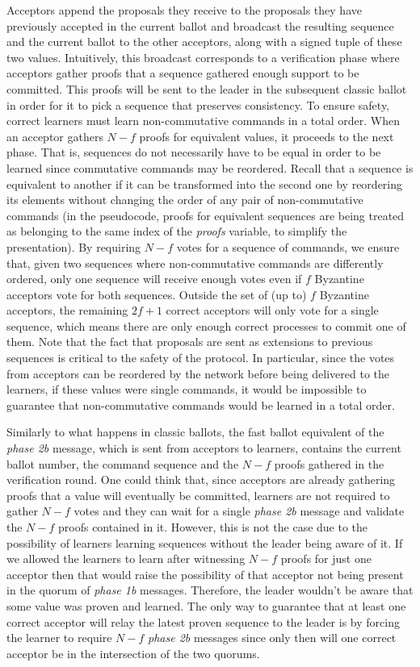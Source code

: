 Acceptors append the proposals they receive to the proposals they have previously accepted in the current ballot and broadcast the resulting sequence and the current ballot to the other acceptors, along with a signed tuple of these two values. Intuitively, this broadcast corresponds to a verification phase where acceptors gather proofs that a sequence gathered enough support to be committed. This proofs will be sent to the leader in the subsequent classic ballot in order for it to pick a sequence that preserves consistency. To ensure safety, correct learners must learn non-commutative commands in a total order. When an acceptor gathers $N-f$ proofs for equivalent values, it proceeds to the next phase. That is, sequences do not necessarily have to be equal in order to be learned since commutative commands may be reordered. Recall that a sequence is equivalent to another if it can be transformed into the second one by reordering its elements without changing the order of any pair of non-commutative commands (in the pseudocode, proofs for equivalent sequences are being treated as belonging to the same index of the \emph{proofs} variable, to simplify the presentation). By requiring $N-f$ votes for a sequence of commands, we ensure that, given two sequences where non-commutative commands are differently ordered, only one sequence will receive enough votes even if $f$ Byzantine acceptors vote for both sequences. Outside the set of (up to) $f$ Byzantine acceptors, the remaining $2f+1$ correct acceptors will only vote for a single sequence, which means there are only enough correct processes to commit one of them. Note that the fact that proposals are sent as extensions to previous sequences is critical to the safety of the protocol. In particular, since the votes from acceptors can be reordered by the network before being delivered to the learners, if these values were single commands, it would be impossible to guarantee that non-commutative commands would be learned in a total order. \par
{} Similarly to what happens in classic ballots, the fast ballot equivalent of the \textit{phase 2b} message, which is sent from acceptors to learners, contains the current ballot number, the command sequence and the $N-f$ proofs gathered in the verification round. One could think that, since acceptors are already gathering proofs that a value will eventually be committed, learners are not required to gather $N-f$ votes and they can wait for a single \textit{phase 2b} message and validate the $N-f$ proofs contained in it. However, this is not the case due to the possibility of learners learning sequences without the leader being aware of it. If we allowed the learners to learn after witnessing $N-f$ proofs for just one acceptor then that would raise the possibility of that acceptor not being present in the quorum of \textit{phase 1b} messages. Therefore, the leader wouldn't be aware that some value was proven and learned. The only way to guarantee that at least one correct acceptor will relay the latest proven sequence to the leader is by forcing the learner to require $N-f$ \textit{phase 2b} messages since only then will one correct acceptor be in the intersection of the two quorums. \par

